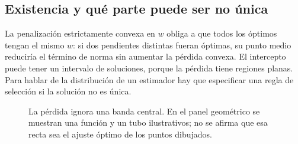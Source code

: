 \documentclass[11pt,a4paper]{article}
\theoremstyle{definition}
\begin{document}
\subsection{Existencia y qué parte puede ser no única}
La penalización estrictamente convexa en $w$ obliga a que todos los óptimos tengan el mismo $w$: si dos pendientes distintas fueran óptimas, su punto medio reduciría el término de norma sin aumentar la pérdida convexa. El intercepto puede tener un intervalo de soluciones, porque la pérdida tiene regiones planas. Para hablar de la distribución de un estimador hay que especificar una regla de selección si la solución no es única.
\begin{figure}[H]\centering
{}\hfill
{}
\caption{La pérdida ignora una banda central. En el panel geométrico se muestran una función y un tubo ilustrativos; no se afirma que esa recta sea el ajuste óptimo de los puntos dibujados.}
\end{figure}
\end{document}
